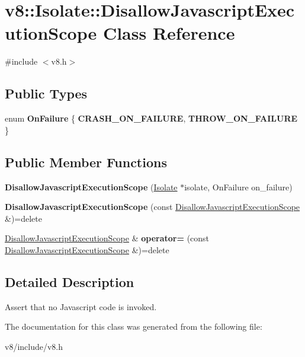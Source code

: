 \hypertarget{classv8_1_1Isolate_1_1DisallowJavascriptExecutionScope}{}\section{v8\+:\+:Isolate\+:\+:Disallow\+Javascript\+Execution\+Scope Class Reference}
\label{classv8_1_1Isolate_1_1DisallowJavascriptExecutionScope}


{\ttfamily \#include $<$v8.\+h$>$}

\subsection*{Public Types}
\begin{DoxyCompactItemize}
\item 
\mbox{\label{classv8_1_1Isolate_1_1DisallowJavascriptExecutionScope_aeb586bef085fba34f97c09afd07ea843}} 
enum {\bfseries On\+Failure} \{ {\bfseries C\+R\+A\+S\+H\+\_\+\+O\+N\+\_\+\+F\+A\+I\+L\+U\+RE}, 
{\bfseries T\+H\+R\+O\+W\+\_\+\+O\+N\+\_\+\+F\+A\+I\+L\+U\+RE}
 \}
\end{DoxyCompactItemize}
\subsection*{Public Member Functions}
\begin{DoxyCompactItemize}
\item 
\mbox{\label{classv8_1_1Isolate_1_1DisallowJavascriptExecutionScope_a64813f7832ddca3014a7b98730a13948}} 
{\bfseries Disallow\+Javascript\+Execution\+Scope} (\mbox{\hyperlink{classv8_1_1Isolate}{Isolate}} $\ast$isolate, On\+Failure on\+\_\+failure)
\item 
\mbox{\label{classv8_1_1Isolate_1_1DisallowJavascriptExecutionScope_a9a0c43b82fe8d0583b7af67af8aa5a33}} 
{\bfseries Disallow\+Javascript\+Execution\+Scope} (const \mbox{\hyperlink{classv8_1_1Isolate_1_1DisallowJavascriptExecutionScope}{Disallow\+Javascript\+Execution\+Scope}} \&)=delete
\item 
\mbox{\label{classv8_1_1Isolate_1_1DisallowJavascriptExecutionScope_a3cab43acfb1e7912dfeddd280750b912}} 
\mbox{\hyperlink{classv8_1_1Isolate_1_1DisallowJavascriptExecutionScope}{Disallow\+Javascript\+Execution\+Scope}} \& {\bfseries operator=} (const \mbox{\hyperlink{classv8_1_1Isolate_1_1DisallowJavascriptExecutionScope}{Disallow\+Javascript\+Execution\+Scope}} \&)=delete
\end{DoxyCompactItemize}


\subsection{Detailed Description}
Assert that no Javascript code is invoked. 

The documentation for this class was generated from the following file\+:\begin{DoxyCompactItemize}
\item 
v8/include/v8.\+h\end{DoxyCompactItemize}
